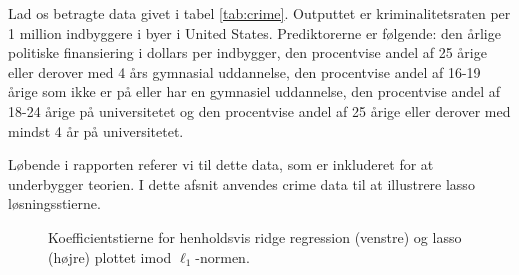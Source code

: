 Lad os betragte data givet i tabel \ref{tab:crime}.
Outputtet er kriminalitetsraten per 1 million indbyggere i byer i United States.
Prediktorerne er følgende: den årlige politiske finansiering i dollars per indbygger, den procentvise andel af 25 årige eller derover med 4 års gymnasial uddannelse, den procentvise andel af 16-19 årige som ikke er på eller har en gymnasiel uddannelse, den procentvise andel af 18-24 årige på universitetet og den procentvise andel af 25 årige eller derover med mindst 4 år på universitetet.
%

%
Løbende i rapporten referer vi til dette data, som er inkluderet for at underbygger teorien.
I dette afsnit anvendes crime data til at illustrere lasso løsningsstierne.
%
\begin{figure}[H]
\centering
\begin{minipage}{0.4\linewidth}
\end{minipage}
\hspace{0.2cm}
\begin{minipage}{0.4\linewidth}
\end{minipage}
\caption{Koefficientstierne for henholdsvis ridge regression (venstre) og lasso (højre) plottet imod \(\ell_1\)-normen.} \label{fig:crime_koef}
\end{figure}

